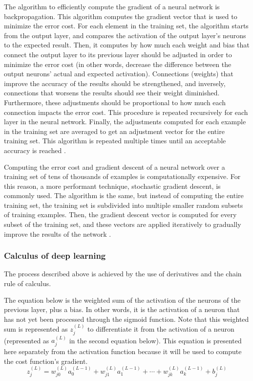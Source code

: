 \documentclass[12pt,a4paper,notitlepage]{article}
\begin{document}
The algorithm to efficiently compute the gradient of a neural network is backpropagation. This algorithm computes the gradient vector that is used to minimize the error cost. For each element in the training set, the algorithm starts from the output layer, and compares the activation of the output layer's neurons to the expected result. Then, it computes by how much each weight and bias that connect the output layer to its previous layer should be adjusted in order to minimize the error cost (in other words, decrease the difference between the output neurons' actual and expected activation). Connections (weights) that improve the accuracy of the results should be strengthened, and inversely, connections that worsens the results should see their weight diminished. Furthermore, these adjustments should be proportional to how much each connection impacts the error cost. This procedure is repeated recursively for each layer in the neural network. Finally, the adjustments computed for each example in the training set are averaged to get an adjustment vector for the entire training set. This algorithm is repeated multiple times until an acceptable accuracy is reached \cite{sanderson_gradient_2017}.

Computing the error cost and gradient descent of a neural network over a training set of tens of thousands of examples is computationally expensive. For this reason, a more performant technique, stochastic gradient descent, is commonly used. The algorithm is the same, but instead of computing the entire training set, the training set is subdivided into multiple smaller random subsets of training examples. Then, the gradient descent vector is computed for every subset of the training set, and these vectors are applied iteratively to gradually improve the results of the network \cite{sanderson_gradient_2017}.


\subsubsection{Calculus of deep learning}
The process described above is achieved by the use of derivatives and the chain rule of calculus.

The equation below is the weighted sum of the activation of the neurons of the previous layer, plus a bias. In other words, it is the activation of a neuron that has not yet been processed through the sigmoid function. Note that this weighted sum is represented as \(z_j^{(L)}\) to differentiate it from the activation of a neuron (represented as \(a_j^{(L)}\) in the second equation below). This equation is presented here separately from the activation function because it will be used to compute the cost function's gradient.
\begin{displaymath}
	z_j^{(L)} = w_{j0}^{(L)}a_0^{(L-1)} + w_{j1}^{(L)}a_1^{(L-1)} + \cdots + w_{jk}^{(L)}a_k^{(L-1)} + b_j^{(L)}
\end{displaymath}
\end{document}
